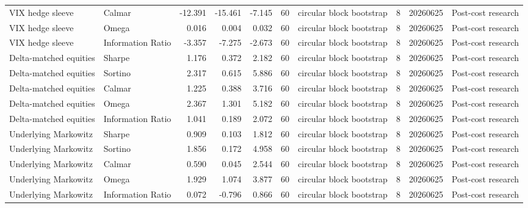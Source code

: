 \begin{tabular}{llrrrrlrrl}
VIX hedge sleeve & Calmar & -12.391 & -15.461 & -7.145 & 60 & circular block bootstrap & 8 & 20260625 & Post-cost research \\
VIX hedge sleeve & Omega & 0.016 & 0.004 & 0.032 & 60 & circular block bootstrap & 8 & 20260625 & Post-cost research \\
VIX hedge sleeve & Information Ratio & -3.357 & -7.275 & -2.673 & 60 & circular block bootstrap & 8 & 20260625 & Post-cost research \\
Delta-matched equities & Sharpe & 1.176 & 0.372 & 2.182 & 60 & circular block bootstrap & 8 & 20260625 & Post-cost research \\
Delta-matched equities & Sortino & 2.317 & 0.615 & 5.886 & 60 & circular block bootstrap & 8 & 20260625 & Post-cost research \\
Delta-matched equities & Calmar & 1.225 & 0.388 & 3.716 & 60 & circular block bootstrap & 8 & 20260625 & Post-cost research \\
Delta-matched equities & Omega & 2.367 & 1.301 & 5.182 & 60 & circular block bootstrap & 8 & 20260625 & Post-cost research \\
Delta-matched equities & Information Ratio & 1.041 & 0.189 & 2.072 & 60 & circular block bootstrap & 8 & 20260625 & Post-cost research \\
Underlying Markowitz & Sharpe & 0.909 & 0.103 & 1.812 & 60 & circular block bootstrap & 8 & 20260625 & Post-cost research \\
Underlying Markowitz & Sortino & 1.856 & 0.172 & 4.958 & 60 & circular block bootstrap & 8 & 20260625 & Post-cost research \\
Underlying Markowitz & Calmar & 0.590 & 0.045 & 2.544 & 60 & circular block bootstrap & 8 & 20260625 & Post-cost research \\
Underlying Markowitz & Omega & 1.929 & 1.074 & 3.877 & 60 & circular block bootstrap & 8 & 20260625 & Post-cost research \\
Underlying Markowitz & Information Ratio & 0.072 & -0.796 & 0.866 & 60 & circular block bootstrap & 8 & 20260625 & Post-cost research \\
\bottomrule
\end{tabular}

